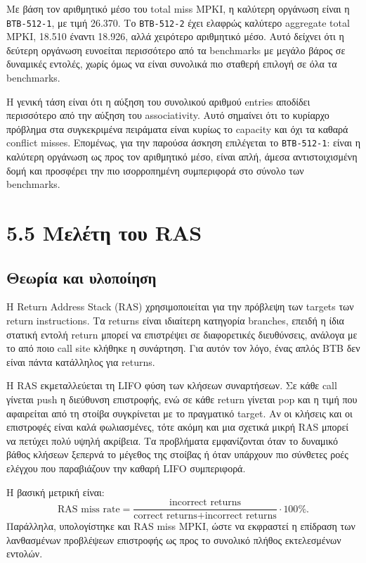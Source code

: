 \documentclass{article}
\begin{document}
Με βάση τον αριθμητικό μέσο του total miss MPKI, η καλύτερη οργάνωση είναι η \texttt{BTB-512-1}, με τιμή 26.370. Το \texttt{BTB-512-2} έχει ελαφρώς καλύτερο aggregate total MPKI, 18.510 έναντι 18.926, αλλά χειρότερο αριθμητικό μέσο. Αυτό δείχνει ότι η δεύτερη οργάνωση ευνοείται περισσότερο από τα benchmarks με μεγάλο βάρος σε δυναμικές εντολές, χωρίς όμως να είναι συνολικά πιο σταθερή επιλογή σε όλα τα benchmarks.

Η γενική τάση είναι ότι η αύξηση του συνολικού αριθμού entries αποδίδει περισσότερο από την αύξηση του associativity. Αυτό σημαίνει ότι το κυρίαρχο πρόβλημα στα συγκεκριμένα πειράματα είναι κυρίως το capacity και όχι τα καθαρά conflict misses. Επομένως, για την παρούσα άσκηση επιλέγεται το \texttt{BTB-512-1}: είναι η καλύτερη οργάνωση ως προς τον αριθμητικό μέσο, είναι απλή, άμεσα αντιστοιχισμένη δομή και προσφέρει την πιο ισορροπημένη συμπεριφορά στο σύνολο των benchmarks.

\FloatBarrier
\section{5.5 Μελέτη του RAS}

\subsection{Θεωρία και υλοποίηση}

Η \foreignlanguage{english}{Return Address Stack} (RAS) χρησιμοποιείται για την πρόβλεψη των targets των return instructions. Τα returns είναι ιδιαίτερη κατηγορία branches, επειδή η ίδια στατική εντολή return μπορεί να επιστρέψει σε διαφορετικές διευθύνσεις, ανάλογα με το από ποιο call site κλήθηκε η συνάρτηση. Για αυτόν τον λόγο, ένας απλός BTB δεν είναι πάντα κατάλληλος για returns.

Η RAS εκμεταλλεύεται τη LIFO φύση των κλήσεων συναρτήσεων. Σε κάθε call γίνεται push η διεύθυνση επιστροφής, ενώ σε κάθε return γίνεται pop και η τιμή που αφαιρείται από τη στοίβα συγκρίνεται με το πραγματικό target. Αν οι κλήσεις και οι επιστροφές είναι καλά φωλιασμένες, τότε ακόμη και μια σχετικά μικρή RAS μπορεί να πετύχει πολύ υψηλή ακρίβεια. Τα προβλήματα εμφανίζονται όταν το δυναμικό βάθος κλήσεων ξεπερνά το μέγεθος της στοίβας ή όταν υπάρχουν πιο σύνθετες ροές ελέγχου που παραβιάζουν την καθαρή LIFO συμπεριφορά.

Η βασική μετρική είναι:
\[
    \text{RAS miss rate} =
    \frac{\text{incorrect returns}}{\text{correct returns} + \text{incorrect returns}} \cdot 100\%.
\]
Παράλληλα, υπολογίστηκε και RAS miss MPKI, ώστε να εκφραστεί η επίδραση των λανθασμένων προβλέψεων επιστροφής ως προς το συνολικό πλήθος εκτελεσμένων εντολών.
\end{document}
